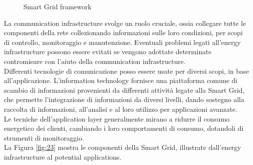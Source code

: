 \begin{figure}[h] 
\caption{Smart Grid framework}\label{fig:22}
\end{figure}

La communication infrastructure svolge un ruolo cruciale, ossia collegare tutte le componenti della rete collezionando informazioni sulle loro condizioni, per scopi di controllo, monitoraggio e manutenzione. Eventuali problemi legati all'energy infrastructure possono essere evitati se vengono adottate determinate contromisure con l'aiuto della communication infrastructure. 
\\ 
Differenti tecnologie di comunicazione posso essere usate per diversi scopi, in base all'applicazione. L'information technology fornisce una piattaforma comune di scambio di informazioni provenienti da differenti attività legate alla Smart Grid, che permette l'integrazione di informazioni da diversi livelli, dando sostegno alla raccolta di informazioni, all'analisi e al loro utilizzo per applicazioni avanzate.
\\
Le tecniche dell'application layer generalmente mirano a ridurre il consumo energetico dei clienti, cambiando i loro comportamenti di consumo, dotandoli di strumenti di monitoraggio.    
\\
La Figura \ref{fig:23} mostra le componenti della Smart Grid, illustrate dall'energy infrastructure al potential applications.

